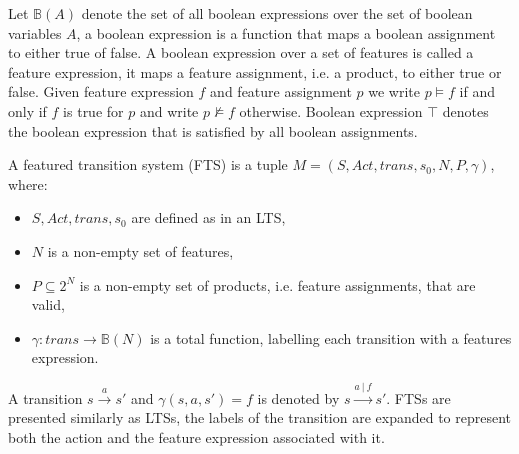 Let $\mathbb{B}(A)$ denote the set of all boolean expressions over the set of boolean variables $A$, a boolean expression is a function that maps a boolean assignment to either true of false. A boolean expression over a set of features is called a feature expression, it maps a feature assignment, i.e. a product, to either true or false. Given feature expression $f$ and feature assignment $p$ we write $p \models f$ if and only if $f$ is true for $p$ and write $p \not\models f$ otherwise. Boolean expression $\top$ denotes the boolean expression that is satisfied by all boolean assignments.
\begin{definition}
	\label{def_fts} A featured transition system (FTS) is a tuple $M = (S, Act, trans, s_0, N, P, \gamma)$, where:
	\begin{itemize}
		\item $S, Act, trans, s_0$ are defined as in an LTS,
		\item $N$ is a non-empty set of features,
		\item $P \subseteq 2^N$ is a non-empty set of products, i.e. feature assignments, that are valid,
		\item $\gamma : trans \rightarrow \mathbb{B}(N)$ is a total function, labelling each transition with a features expression.
	\end{itemize}
\end{definition}
A transition $s \xrightarrow a s'$ and $\gamma(s,a,s') = f$ is denoted by $s \xrightarrow {a\ |\ f} s'$. FTSs are presented similarly as LTSs, the labels of the transition are expanded to represent both the action and the feature expression associated with it.

